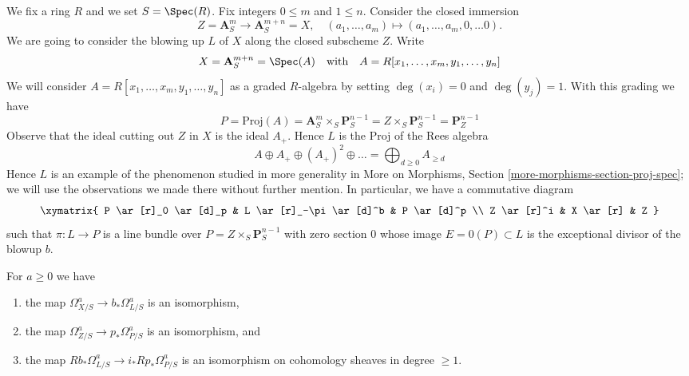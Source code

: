 \medskip\noindent
We fix a ring $R$ and we set $S = \Spec(R)$. Fix integers $0 \leq m$ and
$1 \leq n$. Consider the closed immersion
$$
Z = \mathbf{A}^m_S \longrightarrow \mathbf{A}^{m + n}_S = X,\quad
(a_1, \ldots, a_m) \mapsto (a_1, \ldots, a_m, 0, \ldots 0).
$$
We are going to consider the blowing up $L$ of $X$
along the closed subscheme $Z$. Write
$$
X =
\mathbf{A}^{m + n}_S =
\Spec(A)
\quad\text{with}\quad
A = R[x_1, \ldots, x_m, y_1, \ldots, y_n]
$$
We will consider $A = R[x_1, \ldots, x_m, y_1, \ldots, y_n]$ as a
graded $R$-algebra by setting $\deg(x_i) = 0$ and $\deg(y_j) = 1$.
With this grading we have
$$
P =
\text{Proj}(A) =
\mathbf{A}^m_S \times_S \mathbf{P}^{n - 1}_S =
Z \times_S \mathbf{P}^{n - 1}_S =
\mathbf{P}^{n - 1}_Z
$$
Observe that the ideal cutting out $Z$ in $X$ is the ideal $A_+$.
Hence $L$ is the Proj of the Rees algebra
$$
A \oplus A_+ \oplus (A_+)^2 \oplus \ldots =
\bigoplus\nolimits_{d \geq 0} A_{\geq d}
$$
Hence $L$ is an example of the phenomenon studied in
more generality in More on Morphisms, Section
\ref{more-morphisms-section-proj-spec};
we will use the observations we made there without further mention.
In particular, we have a commutative diagram
$$
\xymatrix{
P \ar[r]_0 \ar[d]_p &
L \ar[r]_-\pi \ar[d]^b &
P \ar[d]^p \\
Z \ar[r]^i &
X \ar[r] &
Z
}
$$
such that $\pi : L \to P$ is a line bundle over
$P = Z \times_S \mathbf{P}^{n - 1}_S$
with zero section $0$ whose image $E = 0(P) \subset L$
is the exceptional divisor of the blowup $b$.

\begin{lemma}
\label{lemma-comparison}
For $a \geq 0$ we have
\begin{enumerate}
\item the map
$\Omega^a_{X/S} \to b_*\Omega^a_{L/S}$ is an isomorphism,
\item the map $\Omega^a_{Z/S} \to p_*\Omega^a_{P/S}$ is an isomorphism,
and
\item the map $Rb_*\Omega^a_{L/S} \to i_*Rp_*\Omega^a_{P/S}$ is an isomorphism
on cohomology sheaves in degree $\geq 1$.
\end{enumerate}
\end{lemma}

